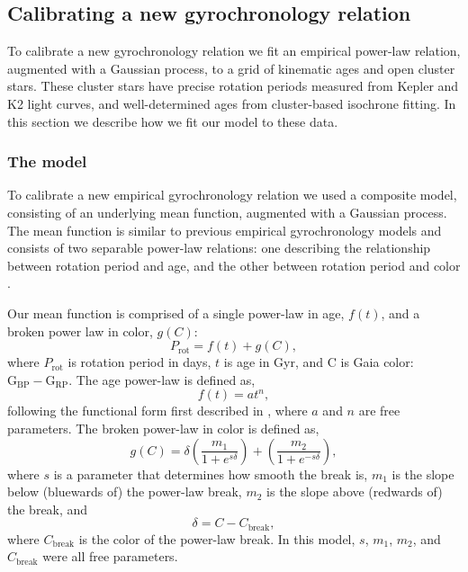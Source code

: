\subsection{Calibrating a new gyrochronology relation}
\label{sec:calibration}

To calibrate a new gyrochronology relation we fit an empirical power-law
relation, augmented with a Gaussian process, to a grid of kinematic ages and
open cluster stars.
These cluster stars have precise rotation periods measured from Kepler and K2
light curves, and well-determined ages from cluster-based isochrone fitting.
In this section we describe how we fit our model to these data.

\subsubsection{The model}

To calibrate a new empirical gyrochronology relation
we used a composite model, consisting of an underlying mean function,
augmented with a Gaussian process.
The mean function is similar to previous empirical gyrochronology models and
consists of two separable power-law relations: one describing the relationship
between rotation period and age, and the other between rotation period and
color \citep[\eg][]{barnes2003, barnes2007, mamajek2008, meibom2015, angus2015,
angus2019}.

Our mean function is comprised of a single power-law in age, $f(t)$, and a
broken power law in color, $g(C)$:
\begin{equation}
P_\mathrm{rot} = f(t) + g(C),
\end{equation}
where $P_\mathrm{rot}$ is rotation period in days, $t$ is age in Gyr, and C is
Gaia color: $\mathrm{G_{BP} - G_{RP}}$.
The age power-law is defined as,
\begin{equation}
f(t) = at^n,
\end{equation}
following the functional form first described in \citep{barnes2003}, where $a$
and $n$ are free parameters.
The broken power-law in color is defined as,
\begin{equation}
g(C) = \delta
\left(\frac{m_1}{1 + e^{s \delta}}\right)
+ \left(\frac{m_2}{1 + e^{-s \delta}}\right),
\end{equation}
where $s$ is a parameter that determines how smooth the break is, $m_1$ is the
slope below (bluewards of) the power-law break, $m_2$ is the slope above
(redwards of) the break, and
\begin{equation}
\delta = C - C_\mathrm{break},
\end{equation}
where $C_\mathrm{break}$ is the color of the power-law break.
In this model, $s$, $m_1$, $m_2$, and $C_\mathrm{break}$ were all free
parameters.

